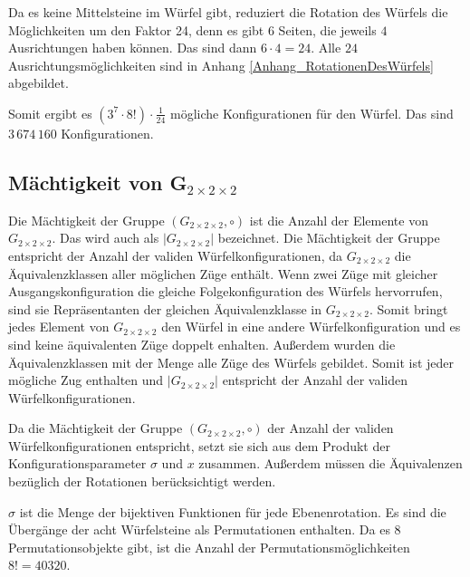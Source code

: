 \documentclass[12pt,a4paper, usenames, dvipsnames]{article}
\theoremstyle{mystyle}
\theoremstyle{definition}
\newcommand{\Gtwo}{\ensuremath{G_{2\times 2\times 2}}}
\begin{document}
Da es keine Mittelsteine im Würfel gibt, reduziert die Rotation des Würfels die Möglichkeiten um den Faktor 24, denn es gibt $6$ Seiten, die jeweils $4$ Ausrichtungen haben können. Das sind dann $6 \cdot 4 = 24$. Alle $24$ Ausrichtungsmöglichkeiten sind in Anhang \ref{Anhang_RotationenDesWürfels} abgebildet.

Somit ergibt es $(3^7 \cdot 8!) \cdot \frac{1}{24}$ mögliche Konfigurationen für den Würfel. Das sind $3\, 674\, 160$ Konfigurationen.



%
%
%
%
%
%
%
%
%
%
%
%
%
%
%
%
%
%
%

\subsection{Mächtigkeit von G$_{2\times 2\times 2}$}

\label{Abschnitt_MächtigkeitVonG}

Die Mächtigkeit der Gruppe $(\Gtwo,\circ)$ ist die Anzahl der Elemente von $\Gtwo$. Das wird auch als $|\Gtwo|$ bezeichnet. Die Mächtigkeit der Gruppe entspricht der Anzahl der validen Würfelkonfigurationen, da $\Gtwo$ die Äquivalenzklassen aller möglichen Züge enthält. Wenn zwei Züge mit gleicher Ausgangskonfiguration die gleiche Folgekonfiguration des Würfels hervorrufen, sind sie Repräsentanten der gleichen Äquivalenzklasse in $\Gtwo$. Somit bringt jedes Element von $\Gtwo$ den Würfel in eine andere Würfelkonfiguration und es sind keine äquivalenten Züge doppelt enhalten. Außerdem wurden die Äquivalenzklassen mit der Menge alle Züge des Würfels gebildet. Somit ist jeder mögliche Zug enthalten und $|\Gtwo|$ entspricht der Anzahl der validen Würfelkonfigurationen.

Da die Mächtigkeit der Gruppe $(\Gtwo,\circ)$ der Anzahl der validen Würfelkonfigurationen entspricht, setzt sie sich aus dem Produkt der Konfigurationsparameter $\sigma$ und $x$ zusammen. Außerdem müssen die Äquivalenzen bezüglich der Rotationen berücksichtigt werden.

$\sigma$ ist die Menge der bijektiven Funktionen für jede Ebenenrotation. Es sind die Übergänge der acht Würfelsteine als Permutationen enthalten. Da es $8$ Permutationsobjekte gibt, ist die Anzahl der Permutationsmöglichkeiten $8! = 40320$.
\end{document}
